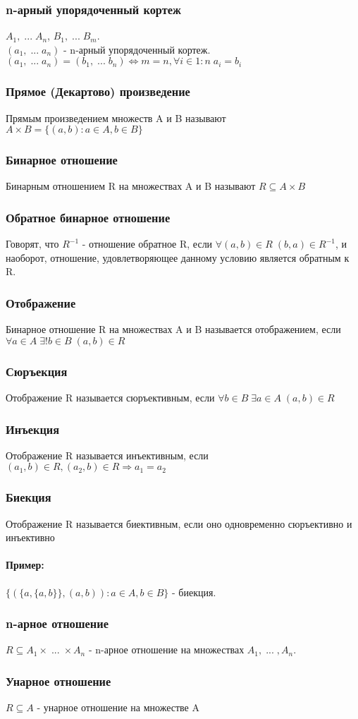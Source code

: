 \subsubsection{n-арный упорядоченный кортеж}
$A_1, \; ... \; A_n$, $B_1, \; ... \; B_m$.\\
$(a_1, \; ... \; a_n)$ - n-арный упорядоченный кортеж.\\
$(a_1, \; ... \; a_n) = (b_1, \; ... \; b_n) \Leftrightarrow m = n, \forall i \in 1:n \; a_i = b_i$ 
\subsubsection{Прямое (Декартово) произведение}
Прямым произведением множеств A и B называют $A \times B = \{(a, b) : a \in A, b \in B\}$
\subsubsection{Бинарное отношение}
Бинарным отношением R на множествах A и B называют $R \subseteq A \times B$
\subsubsection{Обратное бинарное отношение}
Говорят, что $R^{-1}$ - отношение обратное R, если $\forall (a, b) \in R \; (b, a) \in R^{-1}$, и наоборот, отношение, удовлетворяющее данному условию является обратным к R.
\subsubsection{Отображение}
Бинарное отношение R на множествах A и B называется отображением, если $\forall a \in A \; \exists ! b \in B \;(a, b) \in R$
\subsubsection{Сюръекция}
Отображение R называется сюръективным, если $\forall b \in B \; \exists a \in A \;(a, b) \in R$
\subsubsection{Инъекция}
Отображение R называется инъективным, если $(a_1, b) \in R, (a_2, b) \in R \Rightarrow a_1 = a_2$
\subsubsection{Биекция}
Отображение R называется биективным, если оно одновременно сюръективно и инъективно
\paragraph{Пример:}
$\;$ \\ $\{(\{a, \{a, b\}\}, (a, b)) : a \in A, b \in B\}$ - биекция.
\subsubsection{n-арное отношение}
$R \subseteq A_1 \times \; ... \; \times A_n$ - n-арное отношение на множествах $A_1, \; ... \;, A_n$.
\subsubsection{Унарное отношение}
$R \subseteq A$ - унарное отношение на множестве A
